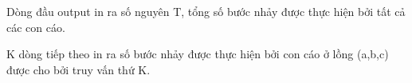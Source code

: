 Dòng đầu output in ra số nguyên T, tổng số bước nhảy được thực hiện bởi tất cả các con cáo.

K dòng tiếp theo in ra số bước nhảy được thực hiện bởi con cáo ở lồng (a,b,c) được cho bởi truy vấn thứ K.